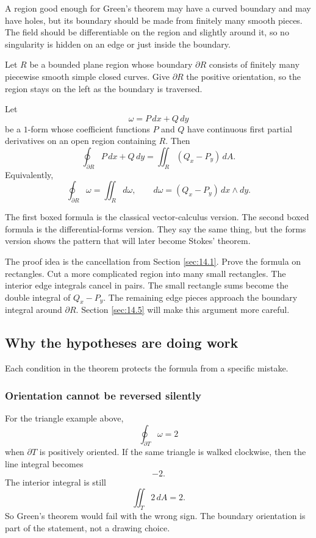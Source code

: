 A region good enough for Green's theorem may have a curved boundary and may have
holes, but its boundary should be made from finitely many smooth pieces.  The field
should be differentiable on the region and slightly around it, so no singularity is hidden
on an edge or just inside the boundary.

\begin{theorem}
Let \(R\) be a bounded plane region whose boundary \(\partial R\) consists of finitely
many piecewise smooth simple closed curves.  Give \(\partial R\) the positive
orientation, so the region stays on the left as the boundary is traversed.

Let
\[
    \omega=P\,dx+Q\,dy
\]
be a \(1\)-form whose coefficient functions \(P\) and \(Q\) have continuous first
partial derivatives on an open region containing \(R\).  Then
\[
\boxed{
    \oint_{\partial R} P\,dx+Q\,dy
    =
    \iint_R (Q_x-P_y)\,dA.
}
\]
Equivalently,
\[
\boxed{
    \oint_{\partial R}\omega
    =
    \iint_R d\omega,
    \qquad
    d\omega=(Q_x-P_y)\,dx\wedge dy.
}
\]
\end{theorem}

The first boxed formula is the classical vector-calculus version.  The second boxed
formula is the differential-forms version.  They say the same thing, but the forms
version shows the pattern that will later become Stokes' theorem.

The proof idea is the cancellation from Section \ref{sec:14.1}.  Prove the formula on
rectangles.  Cut a more complicated region into many small rectangles.  The interior
edge integrals cancel in pairs.  The small rectangle sums become the double integral of
\(Q_x-P_y\).  The remaining edge pieces approach the boundary integral around
\(\partial R\).  Section \ref{sec:14.5} will make this argument more careful.

\subsection{Why the hypotheses are doing work}

Each condition in the theorem protects the formula from a specific mistake.

\subsubsection*{Orientation cannot be reversed silently}

For the triangle example above,
\[
    \oint_{\partial T}\omega=2
\]
when \(\partial T\) is positively oriented.  If the same triangle is walked clockwise,
then the line integral becomes
\[
    -2.
\]
The interior integral is still
\[
    \iint_T 2\,dA=2.
\]
So Green's theorem would fail with the wrong sign.  The boundary orientation is part
of the statement, not a drawing choice.

